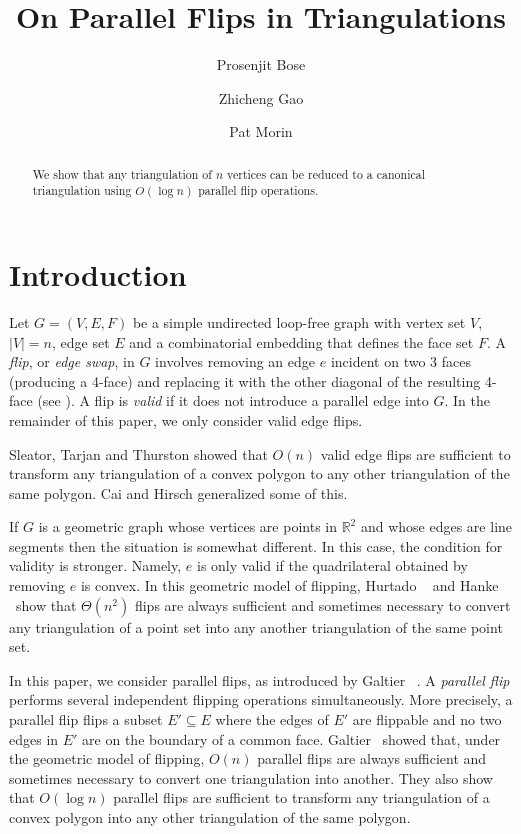 \documentclass{article}
\title{On Parallel Flips in Triangulations}
\author{Prosenjit Bose
	\and Zhicheng Gao 
	\and Pat Morin}
\date{}
\begin{document}
\maketitle

\begin{abstract}
We show that any triangulation of $n$ vertices can be reduced to a
canonical triangulation using $O(\log n)$ parallel flip operations.
\end{abstract}

\section{Introduction}

Let $G=(V,E,F)$ be a simple undirected loop-free graph with vertex set
$V$, $|V|=n$, edge set $E$ and a combinatorial embedding that defines
the face set $F$.  A \emph{flip}, or \emph{edge swap}, in $G$ involves
removing an edge $e$ incident on two 3 faces (producing a 4-face) and
replacing it with the other diagonal of the resulting 4-face (see
).  A flip is \emph{valid} if it does not introduce a
parallel edge into $G$.  In the remainder of this paper, we only
consider valid edge flips.

Sleator, Tarjan and Thurston \cite{sttXX} showed that $O(n)$ valid
edge flips are sufficient to transform any triangulation of a convex
polygon to any other triangulation of the same polygon.  Cai and
Hirsch \cite{chXX} generalized some of this.

If $G$ is a geometric graph whose vertices are points in
$\mathbb{R}^2$ and whose edges are line segments then the situation is
somewhat different.  In this case, the condition for validity is
stronger.  Namely, $e$ is only valid if the quadrilateral obtained by
removing $e$ is convex.  In this geometric model of flipping, Hurtado
\etal\ \cite{hnuXX} and Hanke \etal\ show that $\Theta(n^2)$ flips are
always sufficient and sometimes necessary to convert any triangulation
of a point set into any another triangulation of the same point set.

In this paper, we consider parallel flips, as introduced by Galtier
\etal\ \cite{ghnpXX}.  A \emph{parallel flip} performs several
independent flipping operations simultaneously.  More precisely, a
parallel flip flips a subset $E'\subseteq E$ where the edges of $E'$
are flippable and no two edges in $E'$ are on the boundary of a common
face.  Galtier \etal\ showed that, under the geometric model of
flipping, $O(n)$ parallel flips are always sufficient and sometimes
necessary to convert one triangulation into another.  They also show
that $O(\log n)$ parallel flips are sufficient to transform any
triangulation of a convex polygon into any other triangulation of the
same polygon.
\end{document}

